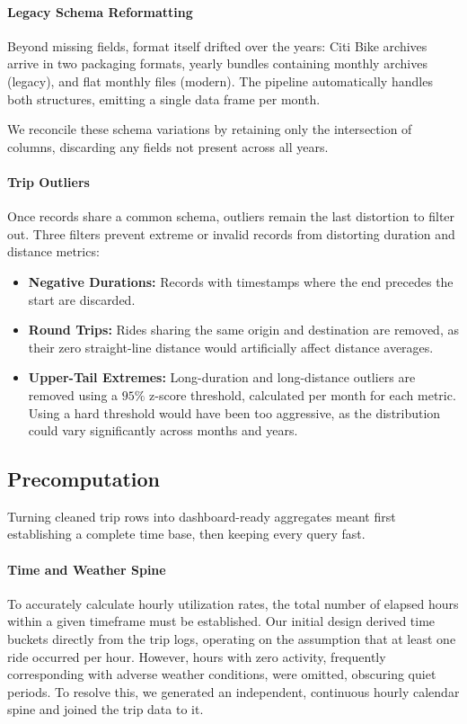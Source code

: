 \paragraph{Legacy Schema Reformatting}
Beyond missing fields, format itself drifted over the years: Citi Bike archives arrive in two packaging formats, yearly bundles containing monthly archives (legacy), and flat monthly files (modern).
The pipeline automatically handles both structures, emitting a single data frame per month.

We reconcile these schema variations by retaining only the intersection of columns, discarding any fields not present across all years.

\paragraph{Trip Outliers}
Once records share a common schema, outliers remain the last distortion to filter out.
Three filters prevent extreme or invalid records from distorting duration and distance metrics:
\begin{itemize}
    \item \textbf{Negative Durations:} Records with timestamps where the end precedes the start are discarded.
    \item \textbf{Round Trips:} Rides sharing the same origin and destination are removed, as their zero straight-line distance would artificially affect distance averages.
    \item \textbf{Upper-Tail Extremes:} Long-duration and long-distance outliers are removed using a $95\%$ z-score threshold, calculated per month for each metric.
    Using a hard threshold would have been too aggressive, as the distribution could vary significantly across months and years.
\end{itemize}

\subsection{Precomputation}
Turning cleaned trip rows into dashboard-ready aggregates meant first establishing a complete time base, then keeping every query fast.

\paragraph{Time and Weather Spine}
To accurately calculate hourly utilization rates, the total number of elapsed hours within a given timeframe must be established.
Our initial design derived time buckets directly from the trip logs, operating on the assumption that at least one ride occurred per hour.
However, hours with zero activity, frequently corresponding with adverse weather conditions, were omitted, obscuring quiet periods.
To resolve this, we generated an independent, continuous hourly calendar spine and joined the trip data to it.

